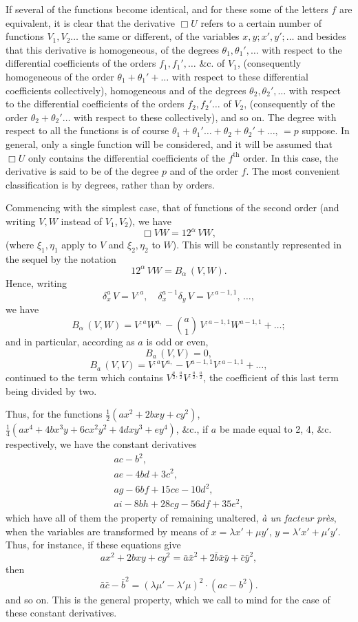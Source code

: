 \documentclass[11pt]{article}
\begin{document}
If several of the functions become identical, and for these some of the letters
$f$ are equivalent, it is clear that the derivative $\Box U$ refers to a certain number of
functions $V_1, V_2 \ldots$ the same or different, of the variables $x, y; x', y';\ldots$ and besides
that this derivative is homogeneous, of the degrees $\theta_1, \theta_1',\ldots$ with respect to the
differential coefficients of the orders $f_1, f_1', \ldots$ \&c. of $V_1$, (consequently homogeneous of
the order $\theta_1 + \theta_1' + \ldots$ with respect to these differential coefficients collectively), homogeneous
and of the degrees $\theta_2, \theta_2',\ldots$ with respect to the differential coefficients of
the orders $f_2, f_2' \ldots$ of $V_2$, (consequently of the order $\theta_2 + \theta_2' \ldots$ with respect to these
collectively), and so on. The degree with respect to all the functions is of course
$\theta_1 + \theta_1' \ldots + \theta_2 + \theta_2' + \ldots,\,=p$ suppose. In general, only a single function will be considered,
and it will be assumed that $\Box U$ only contains the differential coefficients of the
$f^{\text{th}}$ order. In this case, the derivative is said to be of the degree $p$ and of the
order $f$. The most convenient classification is by degrees, rather than by orders.

Commencing with the simplest case, that of functions of the second order (and
writing $V, W$ instead of $V_1, V_2$), we have
\[
\Box V W = 12^\alpha\,V W,
\]
(where $\xi_1, \eta_1$ apply to $V$ and $\xi_2, \eta_2$ to $W$). This will be constantly represented in
the sequel by the notation
\[
12^\alpha\,V W = B_\alpha\,(V, W).
\]
Hence, writing
\[
\delta_x^a\,V = V^{,a},\quad \delta_x^{a-1} \delta_y\,V = V^{,a-1,1},\,\ldots,
\]
we have
\[
B_\alpha\,(V, W) = V^{,a}W^{a,} - {\textstyle\binom{a}{1}}\,V^{,a-1,1}W^{a-1,1} + \ldots;
\]
and in particular, according as $a$ is odd or even,
\[
B_a\,(V, V) = 0,
\]
\[
B_a\,(V, V) = V^{,a}V^{a,} - V^{a-1,1}V^{,a-1,1} + \ldots,
\]
continued to the term which contains $V^{\frac{a}{2}, \frac{a}{2}} V^{,\frac{a}{2},\frac{a}{2}}$, the coefficient of this last term
being divided by two.

Thus, for the functions $\tfrac{1}{2}(a x^2 + 2 b x y + c y^2)$, $\tfrac{1}{4}(a x^4 + 4 b x^3 y + 6 c x^2 y^2 + 4 d x y^3 + e y^4)$, \&c.,
if $a$ be made equal to 2, 4, \&c. respectively, we have the constant derivatives
\[
\begin{aligned}
ac - b^2,\\
ae - 4bd + 3c^2,\\
ag - 6bf + 15ce - 10d^2,\\
ai - 8bh + 28cg - 56df + 35e^2,
\end{aligned}
\]
which have all of them the property of remaining unaltered, \textit{à un facteur près}, when
the variables are transformed by means of $x = \lambda x' + \mu y'$, $y = \lambda' x' + \mu' y'$. Thus, for instance,
if these equations give
\[
ax^2 + 2bxy + cy^2 = \bar{a}\bar{x}^2 + 2\bar{b}\bar{x}\bar{y} + \bar{c}\bar{y}^2,
\]
then
\[
\bar{a}\bar{c} - \bar{b}^2 = (\lambda\mu' - \lambda'\mu)^2 \cdot (ac - b^2).
\]
and so on. This is the general property, which we call to mind for the case of these
constant derivatives.
\end{document}
